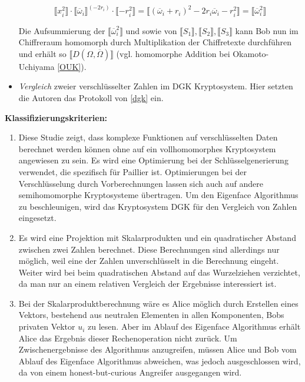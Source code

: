 \begin{itemize}
\begin{equation*}
\llbracket x_i^2 \rrbracket\cdot\llbracket\overline\omega_i\rrbracket^{(-2r_i)}\cdot\llbracket-r_i^2\rrbracket =
\llbracket (\overline\omega_i+r_i)^2-2r_i\overline\omega_i - r_i^2 \rrbracket = \llbracket\overline\omega_i^2 \rrbracket 
\end{equation*}

Die Aufsummierung der $\llbracket\overline\omega_i^2\rrbracket$ und sowie von $\llbracket S_1\rrbracket,\llbracket S_2\rrbracket,\llbracket S_3\rrbracket$ kann Bob nun im Chiffreraum homomorph durch Multiplikation der Chiffretexte durchführen und erhält so $\llbracket D(\Omega,\overline\Omega)\rrbracket$ (vgl. homomorphe Addition bei Okamoto-Uchiyama \ref{OUK}).

\item \textit{Vergleich} zweier verschlüsselter Zahlen im DGK Kryptosystem. Hier setzten die Autoren das Protokoll von \ref{dgk} ein.
\end{itemize}

\textbf{Klassifizierungskriterien:}
\begin{enumerate}
	\item Diese Studie zeigt, dass komplexe Funktionen auf verschlüsselten Daten berechnet werden können ohne auf ein vollhomomorphes Kryptosystem angewiesen zu sein. Es wird eine Optimierung bei der Schlüsselgenerierung verwendet, die spezifisch für Paillier ist. Optimierungen bei der Verschlüsselung durch Vorberechnungen lassen sich auch auf andere semihomomorphe Kryptosysteme übertragen. Um den Eigenface Algorithmus zu beschleunigen, wird das Kryptosystem DGK für den Vergleich von Zahlen eingesetzt.
	\item Es wird eine Projektion mit Skalarprodukten und ein quadratischer Abstand zwischen zwei Zahlen berechnet. Diese Berechnungen sind allerdings nur möglich, weil eine der Zahlen unverschlüsselt in die Berechnung eingeht. Weiter wird bei beim quadratischen Abstand auf das Wurzelziehen verzichtet, da man nur an einem relativen Vergleich der Ergebnisse interessiert ist.
	\item Bei der Skalarproduktberechnung wäre es Alice möglich durch Erstellen eines Vektors, bestehend aus neutralen Elementen in allen Komponenten, Bobs privaten Vektor $u_i$ zu lesen. Aber im Ablauf des Eigenface Algorithmus erhält Alice das Ergebnis dieser Rechenoperation nicht zurück. Um Zwischenergebnisse des Algorithmus anzugreifen, müssen Alice und Bob vom Ablauf des Eigenface Algorithmus abweichen, was jedoch ausgeschlossen wird, da von einem honest-but-curious Angreifer ausgegangen wird.
\end{enumerate}

